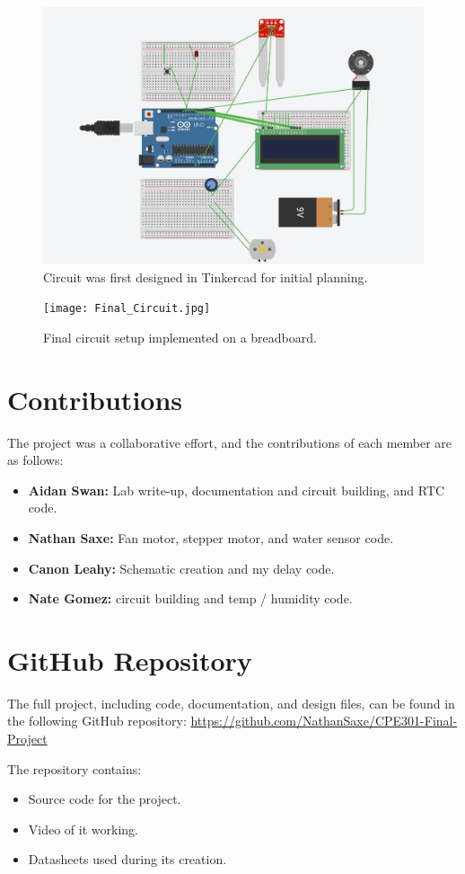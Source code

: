 \documentclass{article}
\begin{document}
\begin{figure}
    \centering
    \includegraphics[width=1\linewidth]{Ciruit_Tinkercad.JPG}
    \caption{Circuit was first designed in Tinkercad for initial planning.}
\end{figure}
\begin{figure}
    \centering
    \texttt{[image: Final\_Circuit.jpg]} %
    \caption{Final circuit setup implemented on a breadboard.}
\end{figure}

\section{Contributions}
The project was a collaborative effort, and the contributions of each member are as follows:
\begin{itemize}
    \item \textbf{Aidan Swan:} Lab write-up, documentation and  circuit building, and RTC code.
    \item \textbf{Nathan Saxe:} Fan motor, stepper motor, and water sensor code.
    \item      \textbf{Canon Leahy:} Schematic creation and my delay code.
    \item \textbf{Nate Gomez:} circuit building and temp / humidity code.

\end{itemize}
\section{GitHub Repository}
The full project, including code, documentation, and design files, can be found in the following GitHub repository:
\url{https://github.com/NathanSaxe/CPE301-Final-Project}

The repository contains:
\begin{itemize}
    \item Source code for the project.
    \item Video of it working.
    \item Datasheets used during its creation.

\end{itemize}
\end{document}
